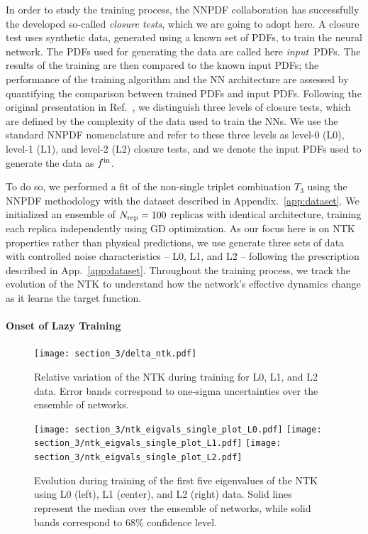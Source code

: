 In order to study the training process, the NNPDF collaboration has successfully
the developed so-called {\em closure tests}, which we are going to adopt here. A
closure test uses synthetic data, generated using a known set of PDFs, to train
the neural network. The PDFs used for generating the data are called here {\em
input}\ PDFs. The results of the training are then compared to the known input
PDFs; the performance of the training algorithm and the NN architecture are
assessed by quantifying the comparison between trained PDFs and input PDFs.
Following the original presentation in Ref.~\cite{NNPDF:2014otw}, we distinguish
three levels of closure tests, which are defined by the complexity of the data
used to train the NNs. We use the standard NNPDF nomenclature and refer to these
three levels as level-0 (L0), level-1 (L1), and level-2 (L2) closure tests, and
we denote the input PDFs used to generate the data as $f^{\rm in}$.

To do so, we performed a
fit of the non-single triplet combination $T_3$ using the NNPDF methodology with
the dataset described in Appendix.~\ref{app:dataset}. We initialized an ensemble
of $N_{\rm rep} = 100$ replicas with identical architecture, training each replica
independently using GD optimization. As our focus here is on NTK properties
rather than physical predictions, we use generate three sets of data with
controlled noise characteristics -- L0, L1, and L2 -- following the prescription
described in App.~\ref{app:dataset}. Throughout the training process, we track
the evolution of the NTK to understand how the network's effective dynamics
change as it learns the target function.

\paragraph{Onset of Lazy Training} 

\begin{figure}[t]
  \centering
  \texttt{[image: section\_3/delta\_ntk.pdf]}
  \caption{Relative variation of the NTK during training for L0, L1, and
  L2 data. Error bands correspond to one-sigma uncertainties over the ensemble
  of networks.}
  \label{fig:NTKTime}
\end{figure}

\begin{figure}[t]
  \centering
  \texttt{[image: section\_3/ntk\_eigvals\_single\_plot\_L0.pdf]}
  \texttt{[image: section\_3/ntk\_eigvals\_single\_plot\_L1.pdf]}
  \texttt{[image: section\_3/ntk\_eigvals\_single\_plot\_L2.pdf]} 
  \caption{Evolution during training of the first five eigenvalues of the NTK
  using L0 (left), L1 (center), and L2 (right) data. Solid lines represent the
  median over the ensemble of networks, while solid bands correspond to 68\%
  confidence level.}
  \label{fig:NTKEigvalsTime}
\end{figure}

